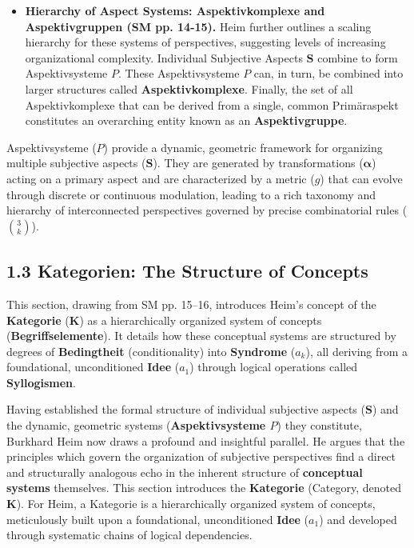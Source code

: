 \documentclass[12pt]{article}
\newcommand{\kategorie}{\bm{K}}
\newcommand{\conceptualsyndrome}{a}
\newcommand{\aspektivsystem}{P}
\begin{document}
\begin{itemize}
    \item \textbf{Hierarchy of Aspect Systems: Aspektivkomplexe and Aspektivgruppen (SM pp. 14-15).}
    Heim further outlines a scaling hierarchy for these systems of perspectives, suggesting levels of increasing organizational complexity. Individual Subjective Aspects \( \mathbf{S} \) combine to form Aspektivsysteme \( \aspektivsystem \). These Aspektivsysteme \( \aspektivsystem \) can, in turn, be combined into larger structures called \textbf{Aspektivkomplexe}. Finally, the set of all Aspektivkomplexe that can be derived from a single, common Primäraspekt constitutes an overarching entity known as an \textbf{Aspektivgruppe}.
\end{itemize}

Aspektivsysteme (\(\aspektivsystem\)) provide a dynamic, geometric framework for organizing multiple subjective aspects (\(\mathbf{S}\)). They are generated by transformations (\(\bm{\alpha}\)) acting on a primary aspect and are characterized by a metric (\(g\)) that can evolve through discrete or continuous modulation, leading to a rich taxonomy and hierarchy of interconnected perspectives governed by precise combinatorial rules (\(\binom{3}{k}\)).

\subsection{1.3 Kategorien: The Structure of Concepts}
\label{sec:kategorien}

This section, drawing from SM pp. 15--16, introduces Heim's concept of the \textbf{Kategorie} (\(\kategorie\)) as a hierarchically organized system of concepts (\textbf{Begriffselemente}). It details how these conceptual systems are structured by degrees of \textbf{Bedingtheit} (conditionality) into \textbf{Syndrome} (\(\conceptualsyndrome_k\)), all deriving from a foundational, unconditioned \textbf{Idee} (\(\conceptualsyndrome_1\)) through logical operations called \textbf{Syllogismen}.

Having established the formal structure of individual subjective aspects (\(\mathbf{S}\)) and the dynamic, geometric systems (\textbf{Aspektivsysteme \(\aspektivsystem\)}) they constitute, Burkhard Heim now draws a profound and insightful parallel. He argues that the principles which govern the organization of subjective perspectives find a direct and structurally analogous echo in the inherent structure of \textbf{conceptual systems} themselves. This section introduces the \textbf{Kategorie} (Category, denoted \(\kategorie\)). For Heim, a Kategorie is a hierarchically organized system of concepts, meticulously built upon a foundational, unconditioned \textbf{Idee} (\(\conceptualsyndrome_1\)) and developed through systematic chains of logical dependencies.
\end{document}
